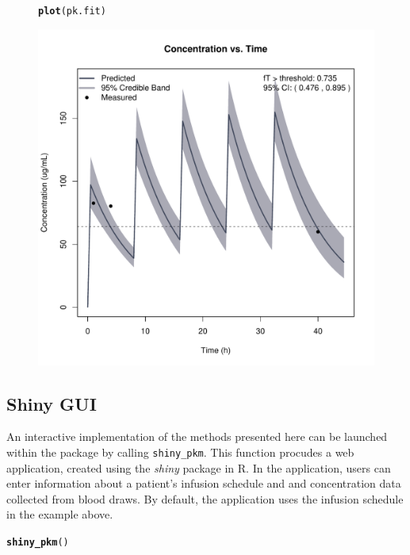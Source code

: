 \documentclass{article}\usepackage[]{graphicx}\usepackage[]{color}
\makeatletter
\def\maxwidth{ %
  \ifdim\Gin@nat@width>\linewidth
    \linewidth
  \else
    \Gin@nat@width
  \fi
}
\newcommand{\hlstd}[1]{\textcolor[rgb]{0.345,0.345,0.345}{#1}}%
\newcommand{\hlkwd}[1]{\textcolor[rgb]{0.737,0.353,0.396}{\textbf{#1}}}%
\newenvironment{kframe}{%
 \def\at@end@of@kframe{}%
 \ifinner\ifhmode%
  \def\at@end@of@kframe{\end{minipage}}%
  \begin{minipage}{\columnwidth}%
 \fi\fi%
 \def\FrameCommand##1{\hskip\@totalleftmargin \hskip-\fboxsep
 \colorbox{shadecolor}{##1}\hskip-\fboxsep
     \hskip-\linewidth \hskip-\@totalleftmargin \hskip\columnwidth}%
 \MakeFramed {\advance\hsize-\width
   \@totalleftmargin\z@ \linewidth\hsize
   \@setminipage}}%
 {\par\unskip\endMakeFramed%
 \at@end@of@kframe}
\newenvironment{knitrout}{}{} %
\makeatother
\begin{document}
\begin{figure}
\begin{knitrout}
\color{fgcolor}\begin{kframe}
\begin{alltt}
\hlkwd{plot}\hlstd{(pk.fit)}
\end{alltt}
\end{kframe}
\includegraphics[width=\maxwidth]{figure/unnamed-chunk-15-1} 

\end{knitrout}
\end{figure}

\subsection{Shiny GUI}

An interactive implementation of the methods presented here can be launched within the package by calling \texttt{shiny_pkm}. This function procudes a web application, created using the {\it shiny} package in R. In the application, users can enter information about a patient's infusion schedule and and concentration data collected from blood draws. By default, the application uses the infusion schedule in the example above.

\begin{knitrout}
\color{fgcolor}\begin{kframe}
\begin{alltt}
\hlkwd{shiny_pkm}\hlstd{()}
\end{alltt}
\end{kframe}
\end{knitrout}
\end{document}
